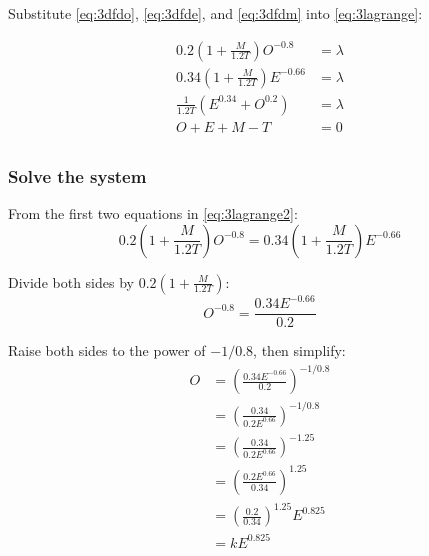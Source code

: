 \documentclass{article}
\begin{document}
Substitute \eqref{eq:3dfdo}, \eqref{eq:3dfde}, and \eqref{eq:3dfdm} into \eqref{eq:3lagrange}:

\begin{equation}\label{eq:3lagrange2}
  \begin{aligned}
    0.2\left( 1 + \frac{M}{1.2 T} \right)O^{-0.8} & = \lambda \\
    0.34\left( 1 + \frac{M}{1.2 T} \right)E^{-0.66} & = \lambda \\
    \frac{1}{1.2 T}\left( E^{0.34} + O^{0.2} \right) & = \lambda \\
    O + E + M - T & = 0 \\
  \end{aligned}
\end{equation}

\subsubsection{Solve the system}

From the first two equations in \eqref{eq:3lagrange2}:
\begin{equation}\label{eq:3lagrange3}
  0.2\left( 1 + \frac{M}{1.2 T} \right)O^{-0.8} = 0.34\left( 1 + \frac{M}{1.2 T} \right)E^{-0.66}
\end{equation}

Divide both sides by $0.2\left( 1 + \frac{M}{1.2 T} \right)$:
\begin{equation}\label{eq:3lagrange4}
  O^{-0.8} = \frac{0.34E^{-0.66}}{0.2}
\end{equation}

Raise both sides to the power of $-1/0.8$, then simplify:
\begin{equation}\label{eq:3lagrange5}
  \begin{split}
    O & = \left(\frac{0.34E^{-0.66}}{0.2}\right)^{-1/0.8} \\
      & = \left(\frac{0.34}{0.2E^{0.66}}\right)^{-1/0.8} \\
      & = \left(\frac{0.34}{0.2E^{0.66}}\right)^{-1.25} \\
      & = \left(\frac{0.2E^{0.66}}{0.34}\right)^{1.25} \\
      & = \left(\frac{0.2}{0.34}\right)^{1.25}E^{0.825} \\
      & = kE^{0.825} \\ %
  \end{split}
\end{equation}
\end{document}
